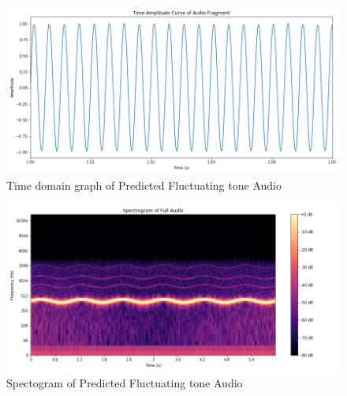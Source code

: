 \documentclass{ioereport}
\begin{document}
    \begin{figure}[H]
        \centering
        \includegraphics[width=\linewidth]{assets/audio_results/Predfluctuating_tone400time.png}
        \caption{Time domain graph of Predicted Fluctuating tone Audio}
        \label{fig:pred-fluctuating-time}
    \end{figure}
    \begin{figure}[H]
        \centering
        \includegraphics[width=\linewidth]{assets/audio_results/Predfluctuating_tone400spec.png}
        \caption{Spectogram of Predicted Fluctuating tone Audio}
        \label{fig:pred-fluctuatung-spec}
    \end{figure}
\end{document}
